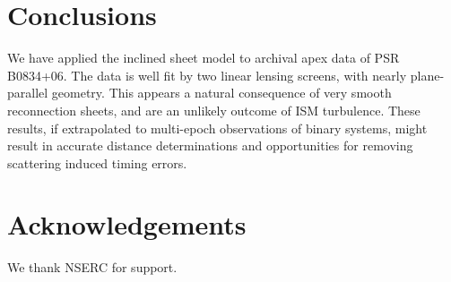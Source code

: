 \documentclass[useAMS,usenatbib]{mn2e}
\begin{document}
\section{Conclusions}

We have applied the \citep{2014MNRAS.442.3338P} inclined
sheet model to archival apex data of PSR B0834+06.  The data is well
fit by two linear lensing screens, with nearly plane-parallel
geometry.  This appears a natural consequence of very smooth
reconnection sheets, and are an unlikely outcome of ISM turbulence.
These results, if extrapolated to multi-epoch observations of binary
systems, might result in accurate distance determinations and
opportunities for removing scattering induced timing errors.


\section{Acknowledgements}

We thank NSERC for support.


\newcommand{\araa}{ARA\&A}   %
\newcommand{\afz}{Afz}       %
\newcommand{\aj}{AJ}         %
\newcommand{\azh}{AZh}       %
\newcommand{\aaa}{A\&A}      %
\newcommand{\aas}{A\&AS}     %
\newcommand{\aar}{A\&AR}     %
\newcommand{\apj}{ApJ}       %
\newcommand{\apjs}{ApJS}     %
\newcommand{\apjl}{ApJ}      %
\newcommand{\apss}{Ap\&SS}   %
\newcommand{\baas}{BAAS}     %
\newcommand{\jaa}{JA\&A}     %
\newcommand{\mnras}{MNRAS}   %
\newcommand{\nat}{Nat}       %
\newcommand{\pasj}{PASJ}     %
\newcommand{\pasp}{PASP}     %
\newcommand{\paspc}{PASPC}   %
\newcommand{\qjras}{QJRAS}   %
\newcommand{\sci}{Sci}       %
\newcommand{\solphys}{Solar Physics}       %
\newcommand{\sova}{SvA}      %
\newcommand{\aap}{A\&A}
\newcommand\jcap{{J. Cosmology Astropart. Phys.}}%
\newcommand{\prd}{Phys. Rev. D}






\label{lastpage}
\end{document}
